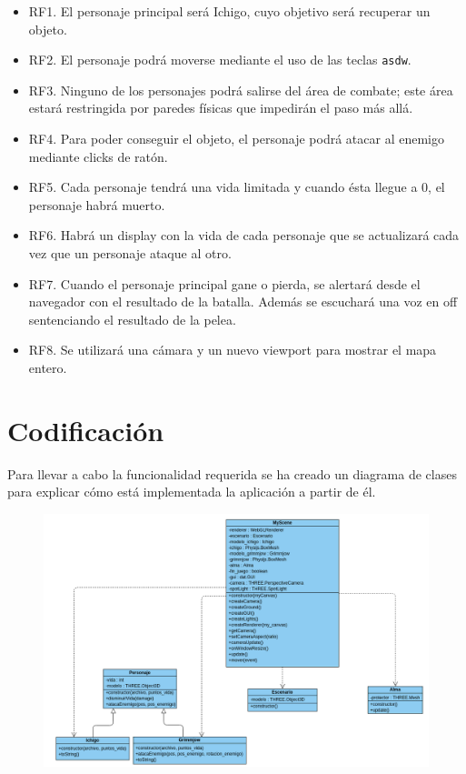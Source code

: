 \documentclass[11pt,a4paper]{article}
\begin{document}
\begin{itemize}
	\item RF1. El personaje principal será Ichigo, cuyo objetivo será recuperar un objeto.
	\item RF2. El personaje podrá moverse mediante el uso de las teclas \color{morado}\texttt{asdw}\color{black}.
	\item RF3. Ninguno de los personajes podrá salirse del área de combate; este área estará restringida por paredes físicas que impedirán el paso más allá.
	\item RF4. Para poder conseguir el objeto, el personaje podrá atacar al enemigo mediante clicks de ratón.
	\item RF5. Cada personaje tendrá una vida limitada y cuando ésta llegue a 0, el personaje habrá muerto.
	\item RF6. Habrá un display con la vida de cada personaje que se actualizará cada vez que un personaje ataque al otro.
	\item RF7. Cuando el personaje principal gane o pierda, se alertará desde el navegador con el resultado de la batalla. Además se escuchará una voz en off sentenciando el resultado de la pelea.
	\item RF8. Se utilizará una cámara y un nuevo viewport para mostrar el mapa entero.
\end{itemize}

\section{Codificación}

Para llevar a cabo la funcionalidad requerida se ha creado un diagrama de clases para explicar cómo está implementada la aplicación a partir de él.

\begin{figure}[H]
	\centering
	\includegraphics[scale=0.4]{img/diagrama.png}
\end{figure}
\end{document}
